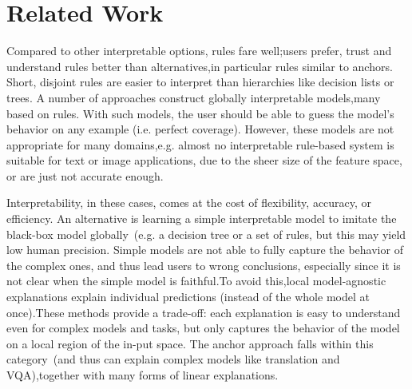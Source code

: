 \section{Related Work} \label{chapter_7:rw}
Compared to other interpretable options, rules fare well;users prefer, trust and understand rules better than alternatives,in particular rules similar to anchors. Short, disjoint rules are easier to interpret than hierarchies like decision lists or trees. A number of approaches construct globally interpretable models,many based on rules. With such models, the user should be able to guess the model’s behavior on any example (i.e. perfect coverage). However, these models are not appropriate for many domains,e.g. almost no interpretable rule-based system is suitable for text or image applications, due to the sheer size of the feature space, or are just not accurate enough. 

\hspace*{3.5mm} Interpretability, in these cases, comes at the cost of flexibility, accuracy, or efficiency. An alternative is learning a simple interpretable model to imitate the black-box model globally~(e.g. a decision tree or a set of rules, but this may yield low human precision. Simple models are not able to fully capture the behavior of the complex ones, and thus lead users to wrong conclusions, especially since it is not clear when the simple model is faithful.To avoid this,local model-agnostic explanations explain individual predictions (instead of the whole model at once).These methods provide a trade-off: each explanation is easy to understand even for complex models and tasks, but only captures the behavior of the model on a local region of the in-put space. The anchor approach falls within this category~(and thus can explain complex models like translation and VQA),together with many forms of linear explanations.

